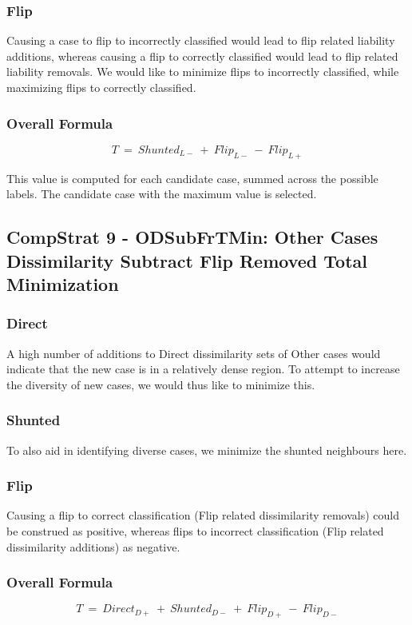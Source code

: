 \documentclass[a4paper,11pt]{report}
\begin{document}
\subsubsection{Flip}
Causing a case to flip to incorrectly classified would lead to flip related liability additions, whereas causing a flip to correctly classified would lead to flip related liability removals. We would like to minimize flips to incorrectly classified, while maximizing flips to correctly classified.

\subsubsection{Overall Formula}
\[  
  T~=~Shunted_{L-}~+~Flip_{L-}~-~Flip_{L+}
\]

This value is computed for each candidate case, summed across the possible labels. The candidate case with the maximum value is selected.

\subsection{CompStrat 9 - ODSubFrTMin: Other Cases Dissimilarity Subtract Flip Removed Total Minimization}

\subsubsection{Direct}
A high number of additions to Direct dissimilarity sets of Other cases would indicate that the new case is in a relatively dense region. To attempt to increase the diversity of new cases, we would thus like to minimize this.

\subsubsection{Shunted}
To also aid in identifying diverse cases, we minimize the shunted neighbours here.

\subsubsection{Flip}
Causing a flip to correct classification (Flip related dissimilarity removals) could be construed as positive, whereas flips to incorrect classification (Flip related dissimilarity additions) as negative.

\subsubsection{Overall Formula}
\[  
  T~=~Direct_{D+}~+~Shunted_{D-}~+~Flip_{D+}~-~Flip_{D-}
\]
\end{document}
